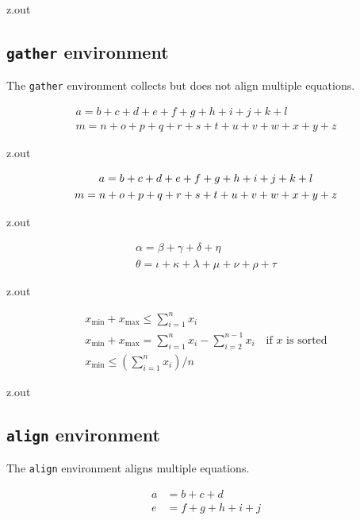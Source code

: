 \MyIO


\begin{VerbatimOut}{z.out}

\subsection{\texttt{gather} environment}

The \verb+gather+ environment collects but does not align multiple equations.

\begin{gather}
  a = b + c + d + e + f + g + h + i + j + k + l\\
  m = n + o + p + q + r + s + t + u + v + w + x + y + z
\end{gather}
\end{VerbatimOut}

\MyIO


\begin{VerbatimOut}{z.out}

\begin{gather}
  a = b + c + d + e + f + g + h + i + j + k + l\notag\\
  m = n + o + p + q + r + s + t + u + v + w + x + y + z
\end{gather}
\end{VerbatimOut}

\MyIO


\begin{VerbatimOut}{z.out}

\begin{gather*}
  \alpha = \beta + \gamma + \delta + \eta\\
  \theta = \iota + \kappa + \lambda + \mu + \nu + \rho + \tau
\end{gather*}
\end{VerbatimOut}

\MyIO


\begin{VerbatimOut}{z.out}

\begin{gather}
  x_\text{min} + x_\text{max} \le \sum_{i=1}^n x_i\\
  x_\text{min} + x_\text{max}
    = \sum_{i=1}^n x_i - \sum_{i=2}^{n-1} x_i\quad\text{if $x$ is sorted}\\
  x_\text{min} \le \left(\sum_{i=1}^n x_i\right) / n
\end{gather}
\end{VerbatimOut}

\MyIO


\begin{VerbatimOut}{z.out}

\subsection{\texttt{align} environment}

The \verb+align+ environment aligns multiple equations.

\begin{align}
  a &= b + c + d\\
  e &= f + g + h + i + j
\end{align}
\end{VerbatimOut}

